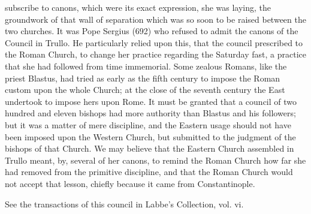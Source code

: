 subscribe to canons, which were its exact expression, she was laying, the groundwork of that wall of separation which was so soon to be raised between the two churches. It was Pope Sergius (692) who refused to admit the canons of the Council in Trullo. He particularly relied upon this, that the council prescribed to the Roman Church, to change her practice regarding the Saturday fast, a practice that she had followed from time immemorial. Some zealous Romans, like the priest Blastus, had tried as early as the fifth century to impose the Roman custom upon the whole Church; at the close of the seventh century the East undertook to impose hers upon Rome. It must be granted that a council of two hundred and eleven bishops had more authority than Blastus and his followers; but it was a matter of mere discipline, and the Eastern usage should not have been imposed upon the Western Church, but submitted to the judgment of the bishops of that Church. We may believe that the Eastern Church assembled in Trullo meant, by, several of her canons, to remind the Roman Church how far she had removed from the primitive discipline, and that the Roman Church would not accept that lesson, chiefly because it came from Constantinople.

See the transactions of this council in Labbe’s Collection, vol. vi.

